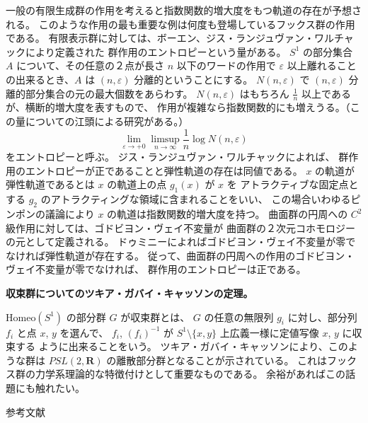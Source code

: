 \documentclass[uplatex,dvipdfmx]{jlreq}
\begin{document}
一般の有限生成群の作用を考えると指数関数的増大度をもつ軌道の存在が予想される。
このような作用の最も重要な例は何度も登場しているフックス群の作用である。
有限表示群に対しては、ボーエン、ジス・ランジュヴァン・ワルチャックにより定義された
群作用のエントロピーという量がある。
$S^1$ の部分集合 $A$ について、その任意の２点が長さ $n$ 以下のワードの作用で
$\varepsilon$ 以上離れることの出来るとき、$A$ は $(n,\varepsilon)$ 分離的ということにする。
$N(n,\varepsilon)$ で $(n,\varepsilon)$ 分離的部分集合の元の最大個数をあらわす。
$N(n,\varepsilon)$ はもちろん $\frac{1}{n}$ 以上であるが、横断的増大度を表すもので、
作用が複雑なら指数関数的にも増えうる。（この量についての江頭による研究がある。）
\[
  \lim_{\varepsilon \to +0} \limsup_{n \to \infty} \frac{1}{n} \log N(n,\varepsilon)
\]
をエントロピーと呼ぶ。
ジス・ランジュヴァン・ワルチャックによれば、
群作用のエントロピーが正であることと弾性軌道の存在は同値である。
$x$ の軌道が弾性軌道であるとは $x$ の軌道上の点 $g_1(x)$ が $x$ を
アトラクティブな固定点とする $g_2$ のアトラクティングな領域に含まれることをいい、
この場合いわゆるピンポンの議論により $x$ の軌道は指数関数的増大度を持つ。
曲面群の円周への $C^2$ 級作用に対しては、ゴドビヨン・ヴェイ不変量が
曲面群の２次元コホモロジーの元として定義される。
ドゥミニーによればゴドビヨン・ヴェイ不変量が零でなければ弾性軌道が存在する。
従って、曲面群の円周への作用のゴドビヨン・ヴェイ不変量が零でなければ、
群作用のエントロピーは正である。

\medskip
\noindent
\textbf{収束群についてのツキア・ガバイ・キャッソンの定理。}

\medskip

$\mathrm{Homeo}(S^1)$ の部分群 $G$ が収束群とは、
$G$ の任意の無限列 $g_i$ に対し、部分列 $f_i$ と点 $x$, $y$ を選んで、
$f_i$, $(f_i)^{-1}$ が $S^1 \setminus \{x, y\}$ 上広義一様に定値写像 $x$, $y$ に収束する
ように出来ることをいう。
ツキア・ガバイ・キャッソンにより、このような群は $PSL(2,\mathbf{R})$ の離散部分群となることが示されている。
これはフックス群の力学系理論的な特徴付けとして重要なものである。
余裕があればこの話題にも触れたい。

\medskip

\begin{center}
  {\large 参考文献}
\end{center}
\end{document}
